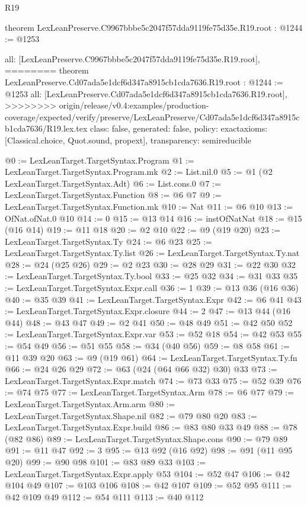 \begin{lexlean}{R19}
\begin{coremodule}
{{{{{{{{{{{{{theorem LexLeanPreserve.C9967bbbe5c2047f57dda9119fe75d35e.R19.root : @1244 := @1253 {
  all: [LexLeanPreserve.C9967bbbe5c2047f57dda9119fe75d35e.R19.root],
========
theorem LexLeanPreserve.Cd07ada5e1dcf6d347a8915cb1cda7636.R19.root : @1244 := @1253 {
  all: [LexLeanPreserve.Cd07ada5e1dcf6d347a8915cb1cda7636.R19.root],
>>>>>>>> origin/release/v0.4:examples/production-coverage/expected/verify/preserve/LexLeanPreserve/Cd07ada5e1dcf6d347a8915cb1cda7636/R19.lex.tex
  class: false,
  generated: false,
  policy: exact{axioms: [Classical.choice, Quot.sound, propext]},
  transparency: semireducible
}

@0 := LexLeanTarget.TargetSyntax.Program
@1 := LexLeanTarget.TargetSyntax.Program.mk
@2 := List.nil.{0}
@5 := @1 (@2 LexLeanTarget.TargetSyntax.Adt)
@6 := List.cons.{0}
@7 := LexLeanTarget.TargetSyntax.Function
@8 := @6 @7
@9 := LexLeanTarget.TargetSyntax.Function.mk
@10 := Nat
@11 := @6 @10
@13 := OfNat.ofNat.{0} @10
@14 := 0
@15 := @13 @14
@16 := instOfNatNat
@18 := @15 (@16 @14)
@19 := @11 @18
@20 := @2 @10
@22 := @9 (@19 @20)
@23 := LexLeanTarget.TargetSyntax.Ty
@24 := @6 @23
@25 := LexLeanTarget.TargetSyntax.Ty.list
@26 := LexLeanTarget.TargetSyntax.Ty.nat
@28 := @24 (@25 @26)
@29 := @2 @23
@30 := @28 @29
@31 := @22 @30
@32 := LexLeanTarget.TargetSyntax.Ty.bool
@33 := @25 @32
@34 := @31 @33
@35 := LexLeanTarget.TargetSyntax.Expr.call
@36 := 1
@39 := @13 @36 (@16 @36)
@40 := @35 @39
@41 := LexLeanTarget.TargetSyntax.Expr
@42 := @6 @41
@43 := LexLeanTarget.TargetSyntax.Expr.closure
@44 := 2
@47 := @13 @44 (@16 @44)
@48 := @43 @47
@49 := @2 @41
@50 := @48 @49
@51 := @42 @50
@52 := LexLeanTarget.TargetSyntax.Expr.var
@53 := @52 @18
@54 := @42 @53
@55 := @54 @49
@56 := @51 @55
@58 := @34 (@40 @56)
@59 := @8 @58
@61 := @11 @39 @20
@63 := @9 (@19 @61)
@64 := LexLeanTarget.TargetSyntax.Ty.fn
@66 := @24 @26 @29
@72 := @63 (@24 (@64 @66 @32) @30) @33
@73 := LexLeanTarget.TargetSyntax.Expr.match
@74 := @73 @33
@75 := @52 @39
@76 := @74 @75
@77 := LexLeanTarget.TargetSyntax.Arm
@78 := @6 @77
@79 := LexLeanTarget.TargetSyntax.Arm.arm
@80 := LexLeanTarget.TargetSyntax.Shape.nil
@82 := @79 @80 @20
@83 := LexLeanTarget.TargetSyntax.Expr.build
@86 := @83 @80 @33 @49
@88 := @78 (@82 @86)
@89 := LexLeanTarget.TargetSyntax.Shape.cons
@90 := @79 @89
@91 := @11 @47
@92 := 3
@95 := @13 @92 (@16 @92)
@98 := @91 (@11 @95 @20)
@99 := @90 @98
@101 := @83 @89 @33
@103 := LexLeanTarget.TargetSyntax.Expr.apply @53
@104 := @52 @47
@106 := @42 @104 @49
@107 := @103 @106
@108 := @42 @107
@109 := @52 @95
@111 := @42 @109 @49
@112 := @54 @111
@113 := @40 @112
}}}}}}}}}}}}}}
\end{coremodule}
\end{lexlean}
